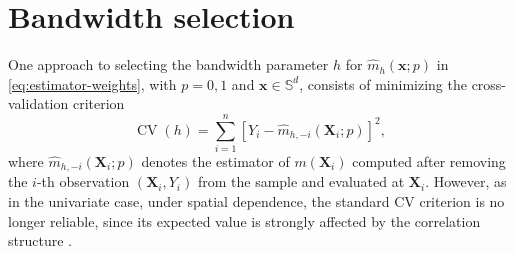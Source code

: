 \documentclass[12pt]{report} %
\newtheorem{theorem}{Theorem}
\newcommand{\bX}{\mathbf{X}}
\newcommand{\bx}{\mathbf{x}}
\newcommand{\Sd}{\mathbb{S}^{d}}
\newcommand{\lc}{\left[}
\newcommand{\rc}{\right]}
\newcommand{\V}[1]{\mathbb{V}\mathrm{ar}\lc #1\rc}
\begin{document}



\section{Bandwidth selection} \label{sec:bandwidth-sph}
One approach to selecting the bandwidth parameter $h$ for $\hat{m}_{h}(\bx;p)$ in \eqref{eq:estimator-weights}, with $p=0,1$ and $\bx\in\Sd$, consists of minimizing the cross-validation criterion
\begin{equation}
\label{eq:cv-sph}
\operatorname{CV}(h)
= \sum_{i=1}^{n} \left[ Y_i  - \hat{m}_{h,-i}(\bX_i;p) \right]^2,
\end{equation}
where $\hat{m}_{h,-i}(\bX_i;p)$ denotes the estimator of $m(\bX_i)$ computed after removing the $i$-th observation $(\bX_i,Y_i)$ from the sample and evaluated at $\bX_i$. However, as in the univariate case, under spatial dependence, the standard CV criterion is no longer reliable, since its expected value is strongly affected by the correlation structure \citep{Opsomer2001}.
\end{document}
